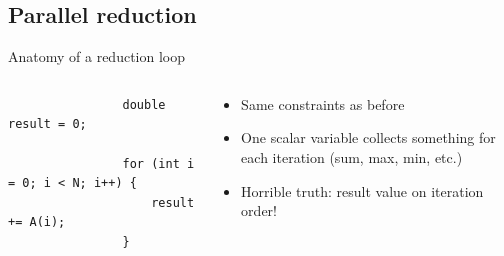 \documentclass[aspectratio=169]{beamer}
\begin{document}

\subsection[Parallel reduction]{Parallel reduction}


\begin{frame}[fragile]{Anatomy of a reduction loop}
    \begin{columns}
        \begin{column}{0.5\linewidth}
            \begin{verbatim}
                double result = 0;

                for (int i = 0; i < N; i++) {
                    result += A(i);
                }
            \end{verbatim}
        \end{column}
        \begin{column}{0.5\linewidth}
            \begin{itemize}
                \item Same constraints as before
                \item One scalar variable collects something for each iteration (sum, max, min, etc.)
                \item Horrible truth: result value  on iteration order!
            \end{itemize}
        \end{column}
    \end{columns}
\end{frame}

\end{document}

